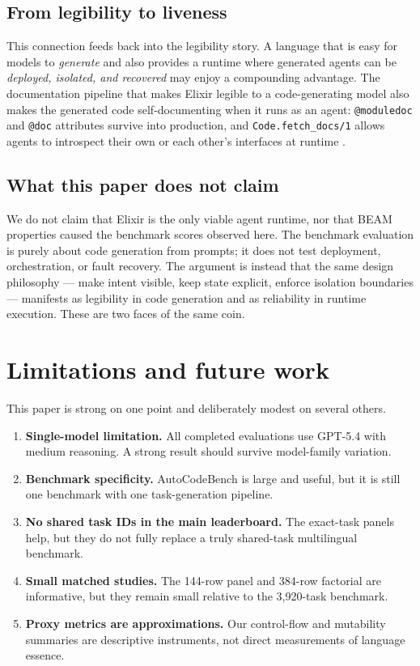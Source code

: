 \documentclass[11pt]{article}
\newcommand{\acb}{AutoCodeBench}
\newcommand{\elixir}{Elixir}
\begin{document}
\subsection{From legibility to liveness}

This connection feeds back into the legibility story. A language that is easy for models to \emph{generate} and also provides a runtime where generated agents can be \emph{deployed, isolated, and recovered} may enjoy a compounding advantage. The documentation pipeline that makes \elixir{} legible to a code-generating model also makes the generated code self-documenting when it runs as an agent: \texttt{@moduledoc} and \texttt{@doc} attributes survive into production, and \texttt{Code.fetch\_docs/1} allows agents to introspect their own or each other's interfaces at runtime \cite{codefetchdocs}.

\subsection{What this paper does not claim}

We do not claim that \elixir{} is the only viable agent runtime, nor that BEAM properties caused the benchmark scores observed here. The benchmark evaluation is purely about code generation from prompts; it does not test deployment, orchestration, or fault recovery. The argument is instead that the same design philosophy --- make intent visible, keep state explicit, enforce isolation boundaries --- manifests as legibility in code generation and as reliability in runtime execution. These are two faces of the same coin.

\section{Limitations and future work}

This paper is strong on one point and deliberately modest on several others.

\begin{enumerate}
  \item \textbf{Single-model limitation.} All completed evaluations use GPT-5.4 with medium reasoning. A strong result should survive model-family variation.
  \item \textbf{Benchmark specificity.} \acb{} is large and useful, but it is still one benchmark with one task-generation pipeline.
  \item \textbf{No shared task IDs in the main leaderboard.} The exact-task panels help, but they do not fully replace a truly shared-task multilingual benchmark.
  \item \textbf{Small matched studies.} The 144-row panel and 384-row factorial are informative, but they remain small relative to the 3,920-task benchmark.
  \item \textbf{Proxy metrics are approximations.} Our control-flow and mutability summaries are descriptive instruments, not direct measurements of language essence.
\end{enumerate}
\end{document}
